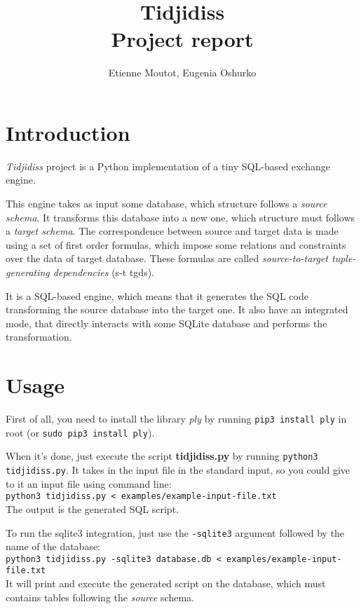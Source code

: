 \documentclass[a4paper,11pt]{article}
\title{{\Huge Tidjidiss}\\
Project report}
\author{Etienne Moutot, Eugenia Oshurko}
\begin{document}
\maketitle

\section{Introduction}
\textit{Tidjidiss} project is a Python implementation of a tiny SQL-based exchange engine.

This engine takes as input some database, which structure follows a \textit{source schema}. It transforms this database into a new one, which structure must follows a \textit{target schema}. The correspondence between source and target data is made using a set of first order formulas, which impose some relations and constraints over the data of target database. These formulas are called \textit{source-to-target tuple-generating dependencies} (s-t tgds).

It is a SQL-based engine, which means that it generates the SQL code transforming the source database into the target one. It also have an integrated mode, that directly interacts with some SQLite database and performs the transformation.

\section{Usage}
First of all, you need to install the library \textit{ply} by running \texttt{pip3 install ply} in root (or \texttt{sudo pip3 install ply}).

When it's done, just execute the script \textbf{tidjidiss.py} by running \texttt{python3 tidjidiss.py}. It takes in the input file in the standard input, so you could give to it an input file using command line:\\
\texttt{python3 tidjidiss.py < examples/example-input-file.txt}\\
The output is the generated SQL script.

To run the sqlite3 integration, just use the \texttt{-sqlite3} argument followed by the name of the database:\\
\texttt{python3 tidjidiss.py -sqlite3 database.db < examples/example-input-file.txt}\\
It will print and execute the generated script on the database, which must contains tables following the \textit{source} schema.
\end{document}
